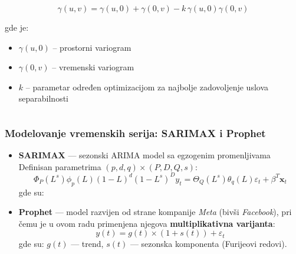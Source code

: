 \begin{frame}
\begin{columns}[T, totalwidth=\textwidth]
\begin{column}{0.43\textwidth}
            {\small
            \[
            \gamma(u, v) = \gamma(u, 0) + \gamma(0, v) - k \, \gamma(u, 0)\gamma(0, v)
            \]
            }

            gde je: 
            \begin{itemize}
                \item $\gamma(u, 0)$ -- prostorni variogram
                \item $\gamma(0, v)$ -- vremenski variogram
                \item $k$ -- parametar određen optimizacijom za najbolje zadovoljenje uslova separabilnosti
            \end{itemize}

        \end{column}

    \end{columns}

\end{frame}


\begin{frame}
    \frametitle{Modelovanje vremenskih serija: SARIMAX i Prophet}

    \begin{itemize}
        \item \textbf{SARIMAX} — sezonski ARIMA model sa egzogenim promenljivama \\
        Definisan parametrima \((p, d, q) \times (P, D, Q, s)\):
        {\small
        \[
        \Phi_P(L^s)\phi_p(L)(1 - L)^d(1 - L^s)^D y_t =
        \Theta_Q(L^s)\theta_q(L)\varepsilon_t + \beta^{T} \mathbf{x}_t 
        \]
        }
        gde su:

        \vspace{0.2cm}
    \item \textbf{Prophet} — model razvijen od strane kompanije \textit{Meta} (bivši \textit{Facebook}), 
    pri čemu je u ovom radu primenjena njegova \textbf{multiplikativna varijanta}:   
        \[
        y(t) = g(t) \times (1 + s(t)) + \varepsilon_t
        \]
        gde su: \(g(t)\) — trend, \(s(t)\) — sezonska komponenta (Furijeovi redovi).
    \end{itemize}
\end{frame}


